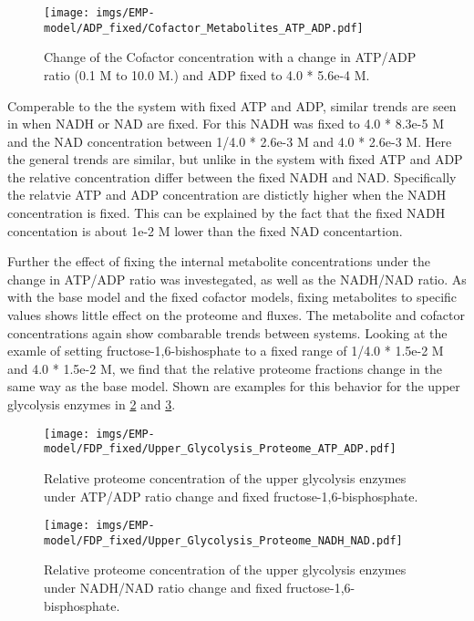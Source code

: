 \begin{figure}[H]
    \centering
    \texttt{[image: imgs/EMP-model/ADP\_fixed/Cofactor\_Metabolites\_ATP\_ADP.pdf]}
    \caption{Change of the Cofactor concentration with a change in ATP/ADP ratio (0.1 M to 10.0 M.) and ADP fixed to 4.0 * 5.6e-4 M.}
    \label{fig:cofactor_adp_fixed_atp}
\end{figure}

Comperable to the the system with fixed ATP and ADP, similar trends are seen in when NADH or NAD are fixed. For this NADH was fixed to 4.0 * 8.3e-5 M and the NAD concentration between 1/4.0 * 2.6e-3 M and 4.0 * 2.6e-3 M. Here the general trends are similar, but unlike in the system with fixed ATP and ADP the relative concentration differ between the fixed NADH and NAD. Specifically the relatvie ATP and ADP concentration are distictly higher when the NADH concentration is fixed. This can be explained by the fact that the fixed NADH concentation is about 1e-2 M lower than the fixed NAD concentartion.

Further the effect of fixing the internal metabolite concentrations under the change in ATP/ADP ratio was investegated, as well as the NADH/NAD ratio. As with the base model and the fixed cofactor models, fixing metabolites to specific values shows little effect on the proteome and fluxes. The metabolite and cofactor concentrations again show combarable trends between systems. Looking at the examle of setting fructose-1,6-bishosphate to a fixed range of 1/4.0 * 1.5e-2 M and 4.0 * 1.5e-2 M, we find that the relative proteome fractions change in the same way as the base model. Shown are examples for this behavior for the upper glycolysis enzymes in \ref{fig:upper_proteome_fdp_fixed_atp} and \ref{fig:upper_proteome_fdp_fixed_nadh}.
\begin{figure}[H]
    \centering
    \texttt{[image: imgs/EMP-model/FDP\_fixed/Upper\_Glycolysis\_Proteome\_ATP\_ADP.pdf]}
    \caption{Relative proteome concentration of the upper glycolysis enzymes under ATP/ADP ratio change and fixed fructose-1,6-bisphosphate.}
    \label{fig:upper_proteome_fdp_fixed_atp}
\end{figure}

\begin{figure}[H]
    \centering
    \texttt{[image: imgs/EMP-model/FDP\_fixed/Upper\_Glycolysis\_Proteome\_NADH\_NAD.pdf]}
    \caption{Relative proteome concentration of the upper glycolysis enzymes under NADH/NAD ratio change and fixed fructose-1,6-bisphosphate.}
    \label{fig:upper_proteome_fdp_fixed_nadh}
\end{figure}

